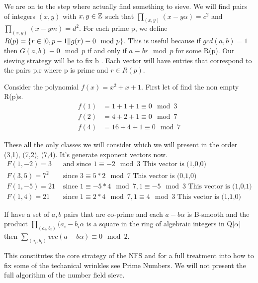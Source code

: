 \documentclass{article}
\begin{document}
We are on to the step where actually find something to sieve. We will find pairs of integers $(x,y)$ with $x, y \in \mathbb{Z}$  such that $\prod_{(x, y) } ( x - y \alpha ) = c^2$ and $\prod_{(x,y)} ( x - ym) = d^2$. For each prime p, we define $R(p) = \{r \in [0, p-1] | g(r) \equiv 0 \mod p \}$. This is useful because if  $gcd(a,b) = 1$ then $G(a,b) \equiv 0 \mod p $ if and only if $a \equiv br \mod p $ for some R(p). Our sieving strategy will be to fix b . Each vector will have entries that correspond to the pairs p,r where p is prime and $r \in R(p)$.
\begin{example}
Consider the polynomial $f(x) = x^2 + x + 1$. First let of find the non empty R(p)s. 
    \begin{align}
        f(1) &= 1 + 1 + 1 \equiv 0 \mod 3 \\
        f(2) &= 4 + 2 + 1 \equiv 0 \mod 7 \\
        f(4) &= 16 + 4 + 1 \equiv 0 \mod 7
    \end{align}
    \end{example}
These all the only classes we will consider which we will present in the order (3,1), (7,2), (7,4). It's generate exponent vectors now. 
\begin{align}
    F(1,-2) = 3 & \text{ and since } 1 \equiv -2 \mod 3 \text{ This vector is (1,0,0)} \\
    F(3,5) = 7^2 & \text{ since } 3 \equiv 5 * 2 \mod 7  \text{ This vector is (0,1,0)} \\
    F(1,-5) = 21 & \text{ since } 1 \equiv -5 * 4 \mod 7 , 1 \equiv -5 \mod 3 \text{ This vector is (1,0,1)} \\
    F(1,4) = 21 & \text{ since } 1 \equiv 2 * 4 \mod 7 , 1 \equiv 4 \mod 3 \text{ This vector is (1,1,0)}
\end{align}
\begin{theorem}
    If have a set of $a,b$ pairs that are co-prime and each $a - b\alpha $ is B-smooth and the product $\prod_{(a_i, b_i)} (a_i - b_i \alpha$ is a square in the ring of algebraic integers in Q[$\alpha$] then $\sum_{(a_i, b_i)} vec(a - b \alpha) \equiv 0 \mod 2$.
\end{theorem}
This constitutes the core strategy of the NFS and for a full treatment into how to fix some of the techanical wrinkles see Prime Numbers\cite{crandall2006prime}. We will not present the full algorithm of the number field sieve. 
\end{document}
